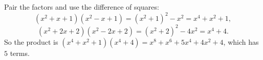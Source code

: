 Pair the factors and use the difference of squares:
\[(x^2+x+1)(x^2-x+1)=(x^2+1)^2-x^2=x^4+x^2+1,\]
\[(x^2+2x+2)(x^2-2x+2)=(x^2+2)^2-4x^2=x^4+4.\]
So the product is $(x^4+x^2+1)(x^4+4)=x^8+x^6+5x^4+4x^2+4$, which has $\boxed{5}$ terms.
